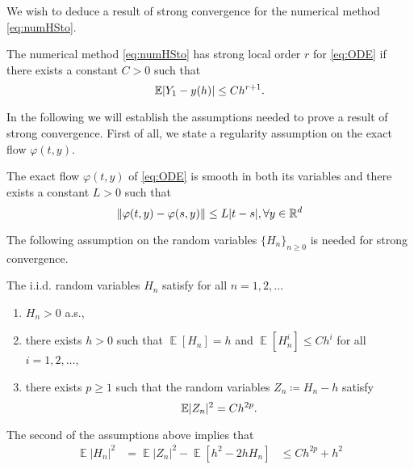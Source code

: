 \documentclass{siamart1116}
\numberwithin{theorem}{section}
\DeclarePairedDelimiter{\abs}{\lvert}{\rvert}
\DeclarePairedDelimiter{\norm}{\|}{\|}
\renewcommand{\phi}{\varphi}
\newcommand{\R}{\mathbb{R}}
\newcommand{\defeq}{\coloneqq}
\newcommand{\E}{\operatorname{\mathbb{E}}}
\begin{document}
We wish to deduce a result of strong convergence for the numerical method \eqref{eq:numHSto}. 
\begin{definition} The numerical method \eqref{eq:numHSto} has strong local order $r$ for \eqref{eq:ODE} if there exists a constant $C > 0$ such that
	\begin{equation}
	\E\abs{Y_1 - y(h)} \leq Ch^{r+1}.
	\end{equation}
\end{definition} 
\noindent In the following we will establish the assumptions needed to prove a result of strong convergence. First of all, we state a regularity assumption on the exact flow $\phi(t,y)$.
\begin{assumption} The exact flow $\phi(t,y)$ of \eqref{eq:ODE} is smooth in both its variables and there exists a constant $L > 0$ such that 
	\begin{equation}
		\norm{\phi(t, y) - \phi(s, y)} \leq L|t - s|, \forall y \in \R^d
 	\end{equation}
\end{assumption}
\noindent The following assumption on the random variables $\{H_n\}_{n\geq 0}$ is needed for strong convergence.
\begin{assumption}\label{as:hStrong} The i.i.d. random variables $H_n$ satisfy for all $n = 1, 2, \ldots$
	\begin{enumerate}
		\item $H_n > 0$ a.s.,
		\item there exists $h > 0$ such that $\E[H_n] = h$ and $\E[H_n^i] \leq Ch^i$ for all $i = 1, 2, \ldots$,
		\item there exists $p \geq 1$ such that the random variables $Z_n \defeq H_n - h$ satisfy
		\begin{equation}
		\E\abs{Z_n}^2 = Ch^{2p}.
		\end{equation}
	\end{enumerate}
\end{assumption}
\begin{remark} The second of the assumptions above implies that
	\begin{equation}
	\begin{aligned}
	\E|H_n|^2 &= \E|Z_n|^2 - \E[h^2 - 2hH_n]
	&\leq Ch^{2p} + h^2
	\end{aligned}
	\end{equation}	
\end{remark}
\end{document}
